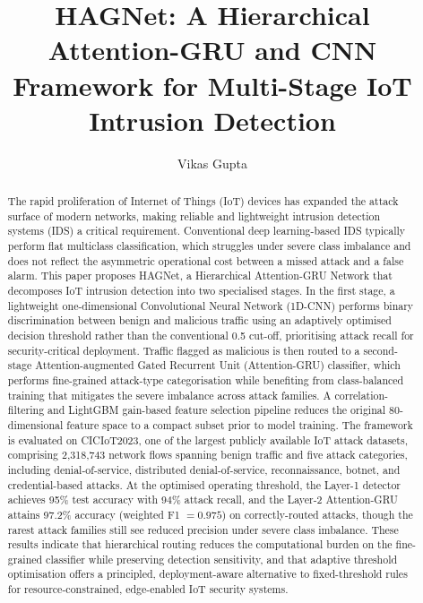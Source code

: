\documentclass{llncs}
\begin{document}
\title{HAGNet: A Hierarchical Attention-GRU and CNN Framework for Multi-Stage IoT Intrusion Detection}

\author{Vikas Gupta}

\maketitle

\begin{abstract}
The rapid proliferation of Internet of Things (IoT) devices has expanded the attack surface of modern networks, making reliable and lightweight intrusion detection systems (IDS) a critical requirement. Conventional deep learning-based IDS typically perform flat multiclass classification, which struggles under severe class imbalance and does not reflect the asymmetric operational cost between a missed attack and a false alarm. This paper proposes HAGNet, a Hierarchical Attention-GRU Network that decomposes IoT intrusion detection into two specialised stages. In the first stage, a lightweight one-dimensional Convolutional Neural Network (1D-CNN) performs binary discrimination between benign and malicious traffic using an adaptively optimised decision threshold rather than the conventional 0.5 cut-off, prioritising attack recall for security-critical deployment. Traffic flagged as malicious is then routed to a second-stage Attention-augmented Gated Recurrent Unit (Attention-GRU) classifier, which performs fine-grained attack-type categorisation while benefiting from class-balanced training that mitigates the severe imbalance across attack families. A correlation-filtering and LightGBM gain-based feature selection pipeline reduces the original 80-dimensional feature space to a compact subset prior to model training. The framework is evaluated on CICIoT2023, one of the largest publicly available IoT attack datasets, comprising 2{,}318{,}743 network flows spanning benign traffic and five attack categories, including denial-of-service, distributed denial-of-service, reconnaissance, botnet, and credential-based attacks. At the optimised operating threshold, the Layer-1 detector achieves 95\% test accuracy with 94\% attack recall, and the Layer-2 Attention-GRU attains 97.2\% accuracy (weighted F1 $=0.975$) on correctly-routed attacks, though the rarest attack families still see reduced precision under severe class imbalance. These results indicate that hierarchical routing reduces the computational burden on the fine-grained classifier while preserving detection sensitivity, and that adaptive threshold optimisation offers a principled, deployment-aware alternative to fixed-threshold rules for resource-constrained, edge-enabled IoT security systems.

\end{abstract}
\end{document}
